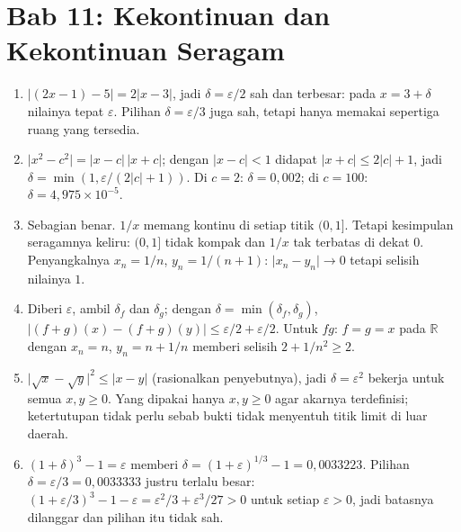 \section*{Bab 11: Kekontinuan dan Kekontinuan Seragam}
\begin{enumerate}[label=\textbf{11.\arabic*}]
  \item $\lvert(2x-1)-5\rvert=2\lvert x-3\rvert$, jadi $\delta=\varepsilon/2$
        sah dan terbesar: pada $x=3+\delta$ nilainya tepat $\varepsilon$.
        Pilihan $\delta=\varepsilon/3$ juga sah, tetapi hanya memakai sepertiga
        ruang yang tersedia.

  \item $\lvert x^{2}-c^{2}\rvert=\lvert x-c\rvert\,\lvert x+c\rvert$; dengan
        $\lvert x-c\rvert<1$ didapat $\lvert x+c\rvert\le2\lvert c\rvert+1$,
        jadi $\delta=\min(1,\varepsilon/(2\lvert c\rvert+1))$. Di $c=2$:
        $\delta=0{,}002$; di $c=100$: $\delta=4{,}975\times10^{-5}$.

  \item Sebagian benar. $1/x$ memang kontinu di setiap titik $(0,1]$. Tetapi
        kesimpulan seragamnya keliru: $(0,1]$ tidak kompak dan $1/x$ tak terbatas
        di dekat $0$. Penyangkalnya $x_{n}=1/n$, $y_{n}=1/(n+1)$:
        $\lvert x_{n}-y_{n}\rvert\to0$ tetapi selisih nilainya $1$.

  \item Diberi $\varepsilon$, ambil $\delta_{f}$ dan $\delta_{g}$; dengan
        $\delta=\min(\delta_{f},\delta_{g})$,
        $\lvert(f+g)(x)-(f+g)(y)\rvert\le\varepsilon/2+\varepsilon/2$.
        Untuk $fg$: $f=g=x$ pada $\mathbb{R}$ dengan $x_{n}=n$,
        $y_{n}=n+1/n$ memberi selisih $2+1/n^{2}\ge2$.

  \item $\lvert\sqrt x-\sqrt y\rvert^{2}\le\lvert x-y\rvert$ (rasionalkan
        penyebutnya), jadi $\delta=\varepsilon^{2}$ bekerja untuk semua
        $x,y\ge0$. Yang dipakai hanya $x,y\ge0$ agar akarnya terdefinisi;
        ketertutupan tidak perlu sebab bukti tidak menyentuh titik limit di luar
        daerah.

  \item 
$(1+\delta)^{3}-1=\varepsilon$ memberi
        $\delta=(1+\varepsilon)^{1/3}-1=0{,}0033223$. Pilihan
        $\delta=\varepsilon/3=0{,}0033333$ justru terlalu besar:
        $(1+\varepsilon/3)^{3}-1-\varepsilon=\varepsilon^{2}/3+\varepsilon^{3}/27>0$
        untuk setiap $\varepsilon>0$, jadi batasnya dilanggar dan pilihan itu tidak
        sah.


\end{enumerate}
